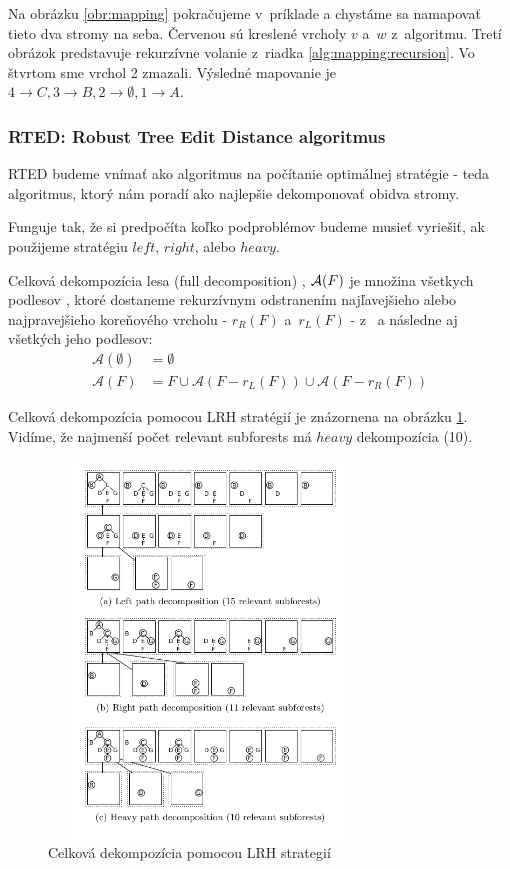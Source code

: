 Na obrázku \ref{obr:mapping} pokračujeme v~príklade a chystáme sa namapovať tieto
dva stromy na seba. Červenou sú kreslené vrcholy $v$ a~$w$ z~algoritmu.
Tretí obrázok predstavuje rekurzívne volanie z~riadka \ref{alg:mapping:recursion}.
Vo štvrtom sme vrchol 2 zmazali.
Výsledné mapovanie je $4 \to C, 3 \to B, 2 \to \emptyset, 1 \to A$.





\subsubsection{RTED: Robust Tree Edit Distance algoritmus}

RTED budeme vnímať ako algoritmus na počítanie optimálnej stratégie - teda algoritmus,
ktorý nám poradí ako najlepšie dekomponovať obidva stromy.

Funguje tak, že si predpočíta koľko podproblémov budeme musieť vyriešiť, ak použijeme stratégiu
$left$, $right$, alebo $heavy$.

\begin{definice}
  Celková dekompozícia lesa (full decomposition) , $\mathcal{A}(F)$ je množina
  všetkych podlesov , ktoré dostaneme rekurzívnym odstranením najľavejšieho
  alebo najpravejšieho koreňového vrcholu - $r_{R}(F)$ a~$r_{L}(F)$ - z~
	a následne aj všetkých jeho podlesov:
	\begin{align*}
		\mathcal{A}(\emptyset) &= \emptyset
		\\
		\mathcal{A}(F) &= {F} \cup \mathcal{A}(F - r_{L}(F)) \cup \mathcal{A}(F - r_{R}(F))
	\end{align*}
\end{definice}

Celková dekompozícia pomocou LRH stratégií je znázornena na obrázku \ref{obr:LRH_decomposition}.
Vidíme, že najmenší počet relevant subforests má $heavy$ dekompozícia (10).

\begin{figure}
\centering
\includegraphics[width=85mm, height=100mm]{../img/LRH_decomposition.png}
\caption{Celková dekompozícia pomocou LRH strategií }
\label{obr:LRH_decomposition}
\end{figure}


